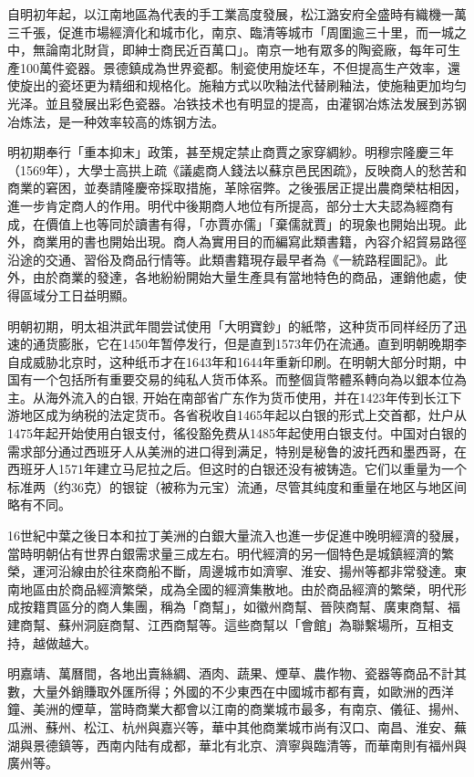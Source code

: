 自明初年起，以江南地區為代表的手工業高度發展，松江潞安府全盛時有織機一萬三千張，促進市場經濟化和城市化，南京、臨清等城市「周圍逾三十里，而一城之中，無論南北財貨，即紳士商民近百萬口」。南京一地有眾多的陶瓷廠，每年可生產100萬件瓷器。景德鎮成為世界瓷都。制瓷使用旋坯车，不但提高生产效率，還使旋出的瓷坯更为精细和规格化。施釉方式以吹釉法代替刷釉法，使施釉更加均匀光泽。並且發展出彩色瓷器。冶铁技术也有明显的提高，由灌钢冶炼法发展到苏钢冶炼法，是一种效率较高的炼钢方法。

明初期奉行「重本抑末」政策，甚至規定禁止商賈之家穿綢紗。明穆宗隆慶三年（1569年），大學士高拱上疏《議處商人錢法以蘇京邑民困疏》，反映商人的愁苦和商業的窘困，並奏請隆慶帝採取措施，革除宿弊。之後張居正提出農商榮枯相因，進一步肯定商人的作用。明代中後期商人地位有所提高，部分士大夫認為經商有成，在價值上也等同於讀書有得，「亦賈亦儒」「棄儒就賈」的現象也開始出現。此外，商業用的書也開始出現。商人為實用目的而編寫此類書籍，內容介紹貿易路徑沿途的交通、習俗及商品行情等。此類書籍現存最早者為《一統路程圖記》。此外，由於商業的發達，各地紛紛開始大量生產具有當地特色的商品，運銷他處，使得區域分工日益明顯。

明朝初期，明太祖洪武年間尝试使用「大明寶鈔」的紙幣，这种货币同样经历了迅速的通货膨胀，它在1450年暂停发行，但是直到1573年仍在流通。直到明朝晚期李自成威胁北京时，这种纸币才在1643年和1644年重新印刷。在明朝大部分时期，中国有一个包括所有重要交易的纯私人货币体系。而整個貨幣體系轉向為以銀本位為主。从海外流入的白银, 开始在南部省广东作为货币使用，并在1423年传到长江下游地区成为纳税的法定货币。各省税收自1465年起以白银的形式上交首都，灶户从1475年起开始使用白银支付，徭役豁免费从1485年起使用白银支付。中国对白银的需求部分通过西班牙人从美洲的进口得到满足，特别是秘鲁的波托西和墨西哥，在西班牙人1571年建立马尼拉之后。但这时的白银还没有被铸造。它们以重量为一个标准两（约36克）的银锭（被称为元宝）流通，尽管其纯度和重量在地区与地区间略有不同。

16世紀中葉之後日本和拉丁美洲的白銀大量流入也進一步促進中晚明經濟的發展，當時明朝佔有世界白銀需求量三成左右。明代經濟的另一個特色是城鎮經濟的繁榮，運河沿線由於往來商船不斷，周邊城市如濟寧、淮安、揚州等都非常發達。東南地區由於商品經濟繁榮，成為全國的經濟集散地。由於商品經濟的繁榮，明代形成按籍貫區分的商人集團，稱為「商幫」，如徽州商幫、晉陝商幫、廣東商幫、福建商幫、蘇州洞庭商幫、江西商幫等。這些商幫以「會館」為聯繫場所，互相支持，越做越大。

明嘉靖、萬曆間，各地出賣絲綢、酒肉、蔬果、煙草、農作物、瓷器等商品不計其數，大量外銷賺取外匯所得；外國的不少東西在中國城市都有賣，如歐洲的西洋鐘、美洲的煙草，當時商業大都會以江南的商業城市最多，有南京、儀征、揚州、瓜洲、蘇州、松江、杭州與嘉兴等，華中其他商業城市尚有汉口、南昌、淮安、蕪湖與景德鎮等，西南内陆有成都，華北有北京、濟寧與臨清等，而華南則有福州與廣州等。

